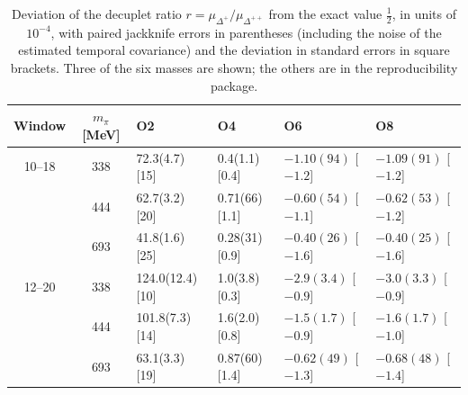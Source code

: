 \documentclass[aps,prd,reprint,twocolumn,superscriptaddress,nofootinbib,longbibliography]{revtex4-2}
\begin{document}
\begin{table}[t]
\caption{Deviation of the decuplet ratio $r=\mu_{\Delta^+}/\mu_{\Delta^{++}}$ from the exact value $\tfrac12$, in units of $10^{-4}$, with paired jackknife errors in parentheses (including the noise of the estimated temporal covariance) and the deviation in standard errors in square brackets. Three of the six masses are shown; the others are in the reproducibility package.}
\label{tab:decuplet}
\centering
\begin{tabular}{ccllll}
\toprule
Window & $m_\pi$ [MeV] & O2 & O4 & O6 & O8\\
\midrule
10--18 & 338 & 72.3(4.7) [15] & 0.4(1.1) [0.4] & $-1.10(94)$ [$-1.2$] & $-1.09(91)$ [$-1.2$]\\
       & 444 & 62.7(3.2) [20] & 0.71(66) [1.1] & $-0.60(54)$ [$-1.1$] & $-0.62(53)$ [$-1.2$]\\
       & 693 & 41.8(1.6) [25] & 0.28(31) [0.9] & $-0.40(26)$ [$-1.6$] & $-0.40(25)$ [$-1.6$]\\
12--20 & 338 & 124.0(12.4) [10] & 1.0(3.8) [0.3] & $-2.9(3.4)$ [$-0.9$] & $-3.0(3.3)$ [$-0.9$]\\
       & 444 & 101.8(7.3) [14] & 1.6(2.0) [0.8] & $-1.5(1.7)$ [$-0.9$] & $-1.6(1.7)$ [$-1.0$]\\
       & 693 & 63.1(3.3) [19] & 0.87(60) [1.4] & $-0.62(49)$ [$-1.3$] & $-0.68(48)$ [$-1.4$]\\
\bottomrule
\end{tabular}
\end{table}
%
\end{document}
